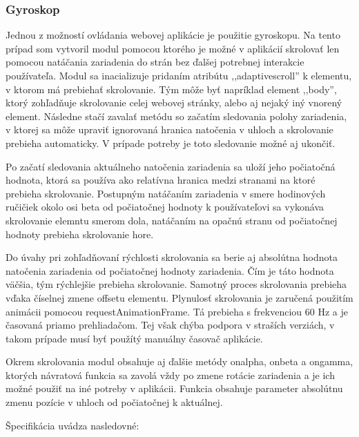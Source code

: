 

\subsubsection{Gyroskop} %
\label{ssub:gyroskop}

Jednou z možností ovládania webovej aplikácie je použitie gyroskopu. Na tento prípad som vytvoril modul pomocou ktorého je možné v aplikácií skrolovať len pomocou natáčania zariadenia do strán bez ďalšej potrebnej interakcie používateľa. Modul sa inacializuje pridaním atribútu ,,adaptivescroll'' k elementu, v ktorom má prebiehať skrolovanie. Tým môže byť napríklad element ,,body'', ktorý zohľadňuje skrolovanie celej webovej stránky, alebo aj nejaký iný vnorený element. Následne stačí zavalať metódu so začatím sledovania polohy zariadenia, v ktorej sa môže upraviť ignorovaná hranica natočenia v uhloch a skrolovanie prebieha automaticky. V prípade potreby je toto sledovanie možné aj ukončiť.

Po začatí sledovania aktuálneho natočenia zariadenia sa uloží jeho počiatočná hodnota, ktorá sa používa ako relatívna hranica medzi stranami na ktoré prebieha skrolovanie. Postupným natáčaním zariadenia v smere hodinových ručičiek okolo osi beta od počiatočnej hodnoty k používateľovi sa vykonáva skrolovanie elemntu smerom dola, natáčaním na opačnú stranu od počiatočnej hodnoty prebieha skrolovanie hore.

Do úvahy pri zohľadňovaní rýchlosti skrolovania sa berie aj absolútna hodnota natočenia zariadenia od počiatočnej hodnoty zariadenia. Čím je táto hodnota väčšia, tým rýchlejšie prebieha skrolovanie. Samotný proces skrolovania prebieha vďaka číselnej zmene offsetu elementu. Plynulosť skrolovania je zaručená použitím animácii pomocou requestAnimationFrame. Tá prebieha s frekvenciou 60 Hz a je časovaná priamo prehliadačom. Tej však chýba podpora v straších verziách, v takom prípade musí byť použítý manuálny časovač aplikácie.

Okrem skrolovania modul obsahuje aj ďalšie metódy onalpha, onbeta a ongamma, ktorých návratová funkcia sa zavolá vždy po zmene rotácie zariadenia a je ich možné použiť na iné potreby v aplikácii. Funkcia obsahuje parameter absolútnu zmenu pozície v uhloch od počiatočnej k aktuálnej.



Špecifikácia uvádza nasledovné:

